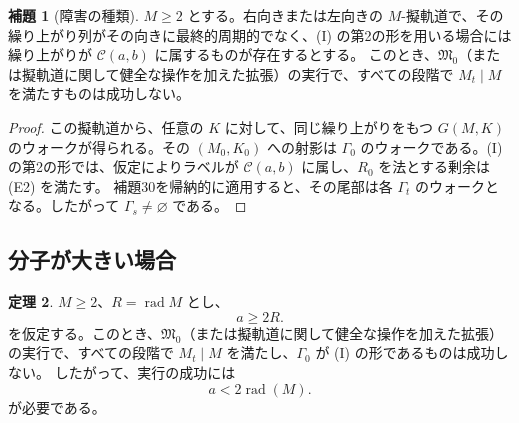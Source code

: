 \documentclass[11pt,reqno]{amsart}
\theoremstyle{definition}
\newtheorem{theorem}{定理}
\newtheorem{lemma}[theorem]{補題}
\theoremstyle{definition}
\theoremstyle{remark}
\begin{document}
\begin{samepage}
\begin{lemma}[障害の種類]\leavevmode\label{thm:38}
\(M\ge2\) とする。右向きまたは左向きの \(M\)-擬軌道で、その繰り上がり列がその向きに最終的周期的でなく、(I) の第2の形を用いる場合には繰り上がりが \(\mathcal C(a,b)\) に属するものが存在するとする。
このとき、\(\mathfrak M_0\)（または擬軌道に関して健全な操作を加えた拡張）の実行で、すべての段階で \(M_t\mid M\) を満たすものは成功しない。
\label{thm-end:38}
\end{lemma}
\end{samepage}

\begin{proof}\leavevmode\label{proof:38}
この擬軌道から、任意の \(K\) に対して、同じ繰り上がりをもつ \(G(M,K)\) のウォークが得られる。その \((M_0,K_0)\) への射影は \(\Gamma_0\) のウォークである。(I) の第2の形では、仮定によりラベルが \(\mathcal C(a,b)\) に属し、\(R_0\) を法とする剰余は (E2) を満たす。
補題30を帰納的に適用すると、その尾部は各 \(\Gamma_t\) のウォークとなる。したがって \(\Gamma_s\ne\varnothing\) である。\qedhere
\end{proof}

\subsection{分子が大きい場合}\label{sec:8.1}

\begin{samepage}
\begin{theorem}\leavevmode\label{thm:39}
\(M\ge2\)、\(R=\operatorname{rad}M\) とし、
\[
a\ge2R.
\]
を仮定する。このとき、\(\mathfrak M_0\)（または擬軌道に関して健全な操作を加えた拡張）の実行で、すべての段階で \(M_t\mid M\) を満たし、\(\Gamma_0\) が (I) の形であるものは成功しない。
したがって、実行の成功には
\[
a<2\operatorname{rad}(M).
\tag{27}\label{eq:27}
\]
が必要である。
\label{thm-end:39}
\end{theorem}
\end{samepage}
\end{document}
